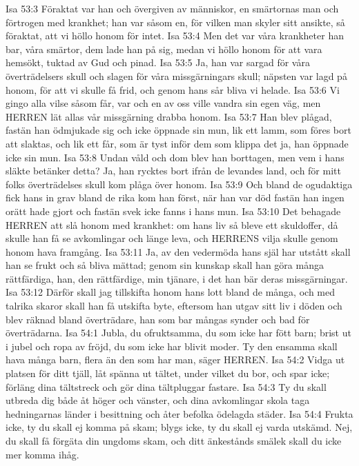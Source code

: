 Isa 53:3  Föraktat var han och övergiven av människor, en smärtornas man och förtrogen med krankhet; han var såsom en, för vilken man skyler sitt ansikte, så föraktat, att vi höllo honom för intet.
Isa 53:4  Men det var våra krankheter han bar, våra smärtor, dem lade han på sig, medan vi höllo honom för att vara hemsökt, tuktad av Gud och pinad.
Isa 53:5  Ja, han var sargad för våra överträdelsers skull och slagen för våra missgärningars skull; näpsten var lagd på honom, för att vi skulle få frid, och genom hans sår bliva vi helade.
Isa 53:6  Vi gingo alla vilse såsom får, var och en av oss ville vandra sin egen väg, men HERREN lät allas vår missgärning drabba honom.
Isa 53:7  Han blev plågad, fastän han ödmjukade sig och icke öppnade sin mun, lik ett lamm, som föres bort att slaktas, och lik ett får, som är tyst inför dem som klippa det ja, han öppnade icke sin mun.
Isa 53:8  Undan våld och dom blev han borttagen, men vem i hans släkte betänker detta? Ja, han rycktes bort ifrån de levandes land, och för mitt folks överträdelses skull kom plåga över honom.
Isa 53:9  Och bland de ogudaktiga fick hans in grav bland de rika kom han först, när han var död fastän han ingen orätt hade gjort och fastän svek icke fanns i hans mun.
Isa 53:10  Det behagade HERREN att slå honom med krankhet: om hans liv så bleve ett skuldoffer, då skulle han få se avkomlingar och länge leva, och HERRENS vilja skulle genom honom hava framgång.
Isa 53:11  Ja, av den vedermöda hans själ har utstått skall han se frukt och så bliva mättad; genom sin kunskap skall han göra många rättfärdiga, han, den rättfärdige, min tjänare, i det han bär deras missgärningar.
Isa 53:12  Därför skall jag tillskifta honom hans lott bland de många, och med talrika skaror skall han få utskifta byte, eftersom han utgav sitt liv i döden och blev räknad bland överträdare, han som bar mångas synder och bad för överträdarna.
Isa 54:1  Jubla, du ofruktsamma, du som icke har fött barn; brist ut i jubel och ropa av fröjd, du som icke har blivit moder. Ty den ensamma skall hava många barn, flera än den som har man, säger HERREN.
Isa 54:2  Vidga ut platsen för ditt tjäll, låt spänna ut tältet, under vilket du bor, och spar icke; förläng dina tältstreck och gör dina tältpluggar fastare.
Isa 54:3  Ty du skall utbreda dig både åt höger och vänster, och dina avkomlingar skola taga hedningarnas länder i besittning och åter befolka ödelagda städer.
Isa 54:4  Frukta icke, ty du skall ej komma på skam; blygs icke, ty du skall ej varda utskämd. Nej, du skall få förgäta din ungdoms skam, och ditt änkestånds smälek skall du icke mer komma ihåg.
